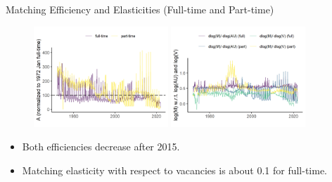 \documentclass[aspectratio=169]{beamer}
\begin{document}
\begin{frame}{Matching Efficiency and Elasticities (Full-time and Part-time)}
    \begin{figure}[!ht]
  \begin{center}
  \includegraphics[width = 0.45\textwidth]
  {figuretable/matching_efficiency_month_full_time_part_time.png}
  \includegraphics[width = 0.45\textwidth]
  {figuretable/elasticity_month_full_time_part_time.png}
  \end{center}
  \footnotesize
\end{figure} 

\begin{itemize}
    \item Both efficiencies decrease after 2015.
    \item Matching elasticity with respect to vacancies is about 0.1 for full-time.
\end{itemize}
\end{frame}
\end{document}
